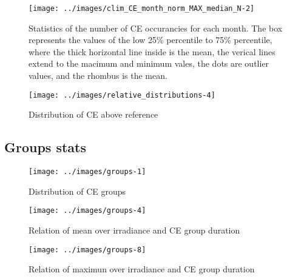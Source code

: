 \documentclass[
]{article}
\begin{document}
\begin{figure}[h!]

{\centering \texttt{[image: ../images/clim\_CE\_month\_norm\_MAX\_median\_N-2]} 

}

\caption{Statistics of the number of CE occurancies for each month. The box represents the values of the low 25\% percentile to 75\% percentile, where the thick horizontal line inside is the mean, the verical lines extend to the macimum and minimum vales, the dots are outlier values, and the rhombus is the mean.}\label{fig:relative-month-occurancies}
\end{figure}

\begin{figure}[h!]

{\centering \texttt{[image: ../images/relative\_distributions-4]} 

}

\caption{Distribution of CE above reference}\label{fig:unnamed-chunk-2}
\end{figure}

\FloatBarrier

\hypertarget{groups-stats}{%
\subsection{Groups stats}\label{groups-stats}}

\begin{figure}[h!]

{\centering \texttt{[image: ../images/groups-1]} 

}

\caption{Distribution of CE groups}\label{fig:unnamed-chunk-3}
\end{figure}

\begin{figure}[h!]

{\centering \texttt{[image: ../images/groups-4]} 

}

\caption{Relation of mean over irradiance and CE group duration}\label{fig:unnamed-chunk-4}
\end{figure}

\begin{figure}[h!]

{\centering \texttt{[image: ../images/groups-8]} 

}

\caption{Relation of maximun over irradiance and CE group duration}\label{fig:unnamed-chunk-5}
\end{figure}
\end{document}
